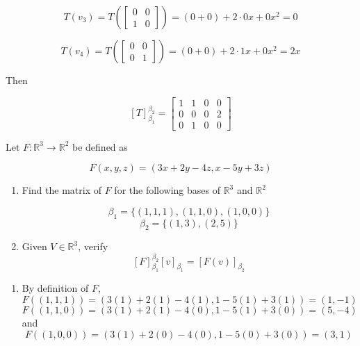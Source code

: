 \documentclass{report}
\begin{document}
\begin{Example}
        $$T(v_3) = T \left(\begin{bmatrix}
            0 & 0 \\
            1 & 0
        \end{bmatrix}\right) = (0 + 0) + 2 \cdot 0x + 0x^2 = 0$$

        $$T(v_4) = T \left(\begin{bmatrix}
            0 & 0 \\
            0 & 1
        \end{bmatrix}\right) = (0 + 0) + 2 \cdot 1x + 0x^2 = 2x$$

        Then

        $$[T]_{\beta_1}^{\beta_2} = \begin{bmatrix}
            1 & 1 & 0 & 0 \\
            0 & 0 & 0 & 2 \\
            0 & 1 & 0 & 0
        \end{bmatrix}$$

        Let $F: \mathbb{R}^3 \to \mathbb{R}^2$ be defined as

        $$F(x, y, z) = (3x + 2y - 4z, x - 5y + 3z)$$

        \begin{enumerate}
            \item Find the matrix of $F$ for the following bases of $\mathbb{R}^3$ and $\mathbb{R}^2$

            $$\beta_1 = \{(1,1,1), (1,1,0), (1,0,0)\}$$
            $$\beta_2 = \{(1,3), (2,5)\}$$

            \item Given $V \in \mathbb{R}^3$, verify
            $$[F]_{\beta_1}^{\beta_2}[v]_{\beta_1} = [F(v)]_{\beta_2}$$
        \end{enumerate}

        \begin{enumerate}
            \item By definition of $F$, 
            $$F((1,1,1)) = (3(1) + 2(1) - 4(1), 1 - 5(1) + 3(1)) = (1, -1)$$
            $$F((1,1,0)) = (3(1) + 2(1) - 4(0), 1 - 5(1) + 3(0)) = (5, -4)$$
            and
            $$F((1,0,0)) = (3(1) + 2(0) - 4(0), 1 - 5(0) + 3(0)) = (3, 1)$$


\end{enumerate}
\end{Example}
\end{document}
